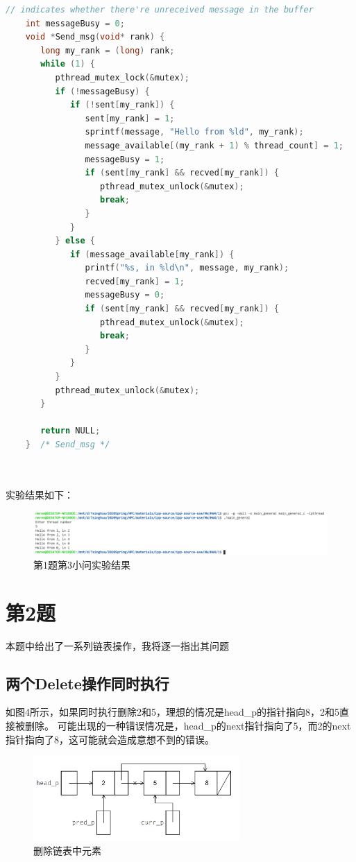 \documentclass[UTF8]{article}
\begin{document}
\begin{lstlisting}[language={c}]
    // indicates whether there're unreceived message in the buffer
    int messageBusy = 0; 
    void *Send_msg(void* rank) {
       long my_rank = (long) rank;
       while (1) {
          pthread_mutex_lock(&mutex);
          if (!messageBusy) {
             if (!sent[my_rank]) {
                sent[my_rank] = 1;
                sprintf(message, "Hello from %ld", my_rank);
                message_available[(my_rank + 1) % thread_count] = 1;
                messageBusy = 1;
                if (sent[my_rank] && recved[my_rank]) {
                   pthread_mutex_unlock(&mutex);
                   break;
                }
             }
          } else {
             if (message_available[my_rank]) {
                printf("%s, in %ld\n", message, my_rank);
                recved[my_rank] = 1;
                messageBusy = 0;
                if (sent[my_rank] && recved[my_rank]) {
                   pthread_mutex_unlock(&mutex);
                   break;
                }
             }
          }
          pthread_mutex_unlock(&mutex);
       }
    
       return NULL;
    }  /* Send_msg */
    
    
    \end{lstlisting}


    实验结果如下：
    \begin{figure}[h]
        \centering
            \includegraphics[width=\textwidth]{1general.png}
            \caption{第1题第3小问实验结果}
        \end{figure}


\section{第2题}
本题中给出了一系列链表操作，我将逐一指出其问题
\subsection{两个Delete操作同时执行}
如图4所示，如果同时执行删除2和5，理想的情况是head\_p的指针指向8，2和5直接被删除。
可能出现的一种错误情况是，head\_p的next指针指向了5，而2的next指针指向了8，这可能就会造成意想不到的错误。

\begin{figure}[h]
   \centering
       \includegraphics[width=0.7\textwidth]{21.png}
       \caption{删除链表中元素}
   \end{figure}
\end{document}
